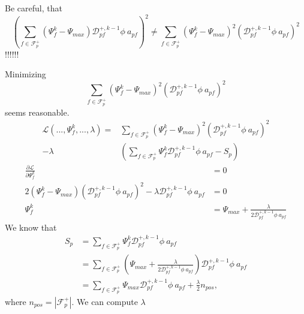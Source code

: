 \documentclass[../thesis.tex]{subfiles}
\begin{document}
Be careful, that
\begin{equation*}
	\left( \sum_{f \in \mathcal{F}_p^+}
	\left( \Psi_{f}^{k} - \Psi_{max} \right) \mathcal{D}^{+,k-1}_{pf}\phi\ a_{pf} \right)^2
	\neq
	\sum_{f \in \mathcal{F}_p^+}
	\left( \Psi_{f}^{k} - \Psi_{max} \right)^2\left( \mathcal{D}^{+,k-1}_{pf}\phi\ a_{pf} \right)^2
\end{equation*}
!!!!!!

Minimizing
\begin{equation}
	\sum_{f \in \mathcal{F}_p^+}
	\left( \Psi_{f}^{k} - \Psi_{max} \right)^2\left( \mathcal{D}^{+,k-1}_{pf}\phi\ a_{pf} \right)^2
\end{equation}
seems reasonable.
\begin{equation}
	\begin{split}
		\mathcal{L}(...,\Psi_{f}^{k},...,\lambda) =
		&\sum_{f \in \mathcal{F}_p^+}
		\left( \Psi_{f}^{k} - \Psi_{max} \right)^2\left( \mathcal{D}^{+,k-1}_{pf}\phi\ a_{pf} \right)^2
		\\
		-\lambda&\left( \sum_{f \in \mathcal{F}_p^+}
		\Psi_{f}^{k} \mathcal{D}^{+,k-1}_{pf}\phi\ a_{pf} - S_p \right)
	\end{split}
\end{equation}
\begin{equation*}
	\begin{split}
		\frac{\partial \mathcal{L}}{\partial \Psi_f^k}
		&= 0
		\\
		2\left( \Psi_{f}^{k} - \Psi_{max} \right)\left( \mathcal{D}^{+,k-1}_{pf}\phi\ a_{pf} \right)^2
		-
		\lambda \mathcal{D}^{+,k-1}_{pf}\phi\ a_{pf}
		&= 0
		\\
		\Psi_{f}^{k}
		&= \Psi_{max} + \frac{\lambda}{2 \mathcal{D}^{+,k-1}_{pf}\phi\ a_{pf}}
	\end{split}
\end{equation*}
We know that
\begin{equation}
	\begin{split}
		S_p &=
		\sum_{f \in \mathcal{F}_p^+}
		\Psi_{f}^{k} \mathcal{D}^{+,k-1}_{pf}\phi\ a_{pf}
		\\
		&= \sum_{f \in \mathcal{F}_p^+}
		\left( \Psi_{max} + \frac{\lambda}{2 \mathcal{D}^{+,k-1}_{pf}\phi\ a_{pf}} \right) \mathcal{D}^{+,k-1}_{pf}\phi\ a_{pf}
		\\
		&= \sum_{f \in \mathcal{F}_p^+}
		\Psi_{max} \mathcal{D}^{+,k-1}_{pf}\phi\ a_{pf}
		+ \frac{\lambda}{2}n_{pos},
	\end{split}
\end{equation}
where \( n_{pos} = |\mathcal{F}_p^+| \). We can compute \( \lambda \)
\end{document}
